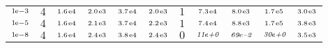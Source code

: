 \begin{tiny}
\begin{tabular}{@{$\;$}c@{$\;$}|@{$\;$}c@{$\;$}@{$\;$}c@{$\;$}@{$\;$}c@{$\;$}@{$\;$}c@{$\;$}@{$\;$}c@{$\;$}|@{$\;$}c@{$\;$}@{$\;$}c@{$\;$}@{$\;$}c@{$\;$}@{$\;$}c@{$\;$}@{$\;$}c@{$\;$}}
$\scriptstyle1\!\mathrm{\hspace{0.10em}e}-3$ & $\scriptstyle4$ & $\scriptstyle1.6\mathrm{\hspace{0.10em}e}4$ & $\scriptstyle2.0\mathrm{\hspace{0.10em}e}3$ & $\scriptstyle3.7\mathrm{\hspace{0.10em}e}4$ & $\scriptstyle2.0\mathrm{\hspace{0.10em}e}3$ & $\scriptstyle1$ & $\scriptstyle7.3\mathrm{\hspace{0.10em}e}4$ & $\scriptstyle8.0\mathrm{\hspace{0.10em}e}3$ & $\scriptstyle1.7\mathrm{\hspace{0.10em}e}5$ & $\scriptstyle3.0\mathrm{\hspace{0.10em}e}3$\\ 
$\scriptstyle1\!\mathrm{\hspace{0.10em}e}-5$ & $\scriptstyle4$ & $\scriptstyle1.6\mathrm{\hspace{0.10em}e}4$ & $\scriptstyle2.1\mathrm{\hspace{0.10em}e}3$ & $\scriptstyle3.7\mathrm{\hspace{0.10em}e}4$ & $\scriptstyle2.2\mathrm{\hspace{0.10em}e}3$ & $\scriptstyle1$ & $\scriptstyle7.4\mathrm{\hspace{0.10em}e}4$ & $\scriptstyle8.8\mathrm{\hspace{0.10em}e}3$ & $\scriptstyle1.7\mathrm{\hspace{0.10em}e}5$ & $\scriptstyle3.8\mathrm{\hspace{0.10em}e}3$\\ 
$\scriptstyle1\!\mathrm{\hspace{0.10em}e}-8$ & $\scriptstyle4$ & $\scriptstyle1.6\mathrm{\hspace{0.10em}e}4$ & $\scriptstyle2.4\mathrm{\hspace{0.10em}e}3$ & $\scriptstyle3.8\mathrm{\hspace{0.10em}e}4$ & $\scriptstyle2.4\mathrm{\hspace{0.10em}e}3$ & $\scriptstyle0$ & $\scriptstyle\textit{11}\hspace{0.00em}e\textit{+0}$ & $\scriptstyle\textit{69}\hspace{0.00em}e\textit{--2}$ & $\scriptstyle\textit{30}\hspace{0.00em}e\textit{+0}$ & $\scriptstyle3.5\mathrm{\hspace{0.10em}e}3$\\ 
\end{tabular} 
\end{tiny} 
